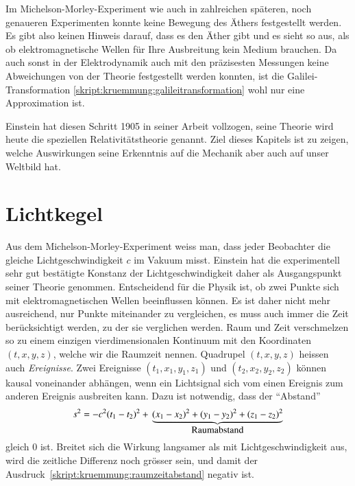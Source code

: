 Im Michelson-Morley-Experiment wie auch in zahlreichen späteren, noch
genaueren Experimenten konnte keine Bewegung des Äthers festgestellt
werden.
Es gibt also keinen Hinweis darauf, dass es den Äther gibt und es
sieht so aus, als ob elektromagnetische Wellen für Ihre Ausbreitung
kein Medium brauchen.
Da auch sonst in der Elektrodynamik auch mit den präzisesten Messungen
keine Abweichungen von der Theorie festgestellt werden konnten,
ist die Galilei-Transformation
\eqref{skript:kruemmung:galileitransformation} wohl nur eine
Approximation ist.

Einstein hat diesen Schritt 1905 in seiner Arbeit \cite{skript:einstein}
vollzogen, seine Theorie wird heute die speziellen Relativitätstheorie genannt.
Ziel dieses Kapitels ist zu zeigen, welche Auswirkungen seine
Erkenntnis auf die Mechanik aber auch auf unser Weltbild hat.
%
%

\section{Lichtkegel%
\label{skript:speziell:section:lichtkegel}}
Aus dem Michelson-Morley-Experiment weiss man, dass jeder Beobachter
die gleiche Lichtgeschwindigkeit $c$ im Vakuum misst.
Einstein hat die experimentell sehr gut bestätigte Konstanz der
Lichtgeschwindigkeit daher als Ausgangspunkt seiner Theorie genommen.
Entscheidend für die Physik ist, ob zwei Punkte sich mit elektromagnetischen
Wellen beeinflussen können.
Es ist daher nicht mehr ausreichend, nur Punkte miteinander zu vergleichen,
es muss auch immer die Zeit berücksichtigt werden, zu der sie verglichen
werden.
Raum und Zeit verschmelzen so zu einem einzigen vierdimensionalen
Kontinuum mit den Koordinaten $(t,x,y,z)$, welche wir die Raumzeit
nennen.
%
Quadrupel $(t,x,y,z)$ heissen auch {\em Ereignisse}.
%
Zwei Ereignisse $(t_1,x_1,y_1,z_1)$ und $(t_2,x_2,y_2,z_2)$ können
kausal voneinander abhängen, wenn ein Lichtsignal sich vom einen Ereignis
zum anderen Ereignis ausbreiten kann.
Dazu ist notwendig, dass der ``Abstand''
\begin{equation}
s^2
=
-c^2(t_1-t_2)^2
+
\mathstrut
\underbrace{
(x_1-x_2)^2
+
(y_1-y_2)^2
+
(z_1-z_2)^2}_{\displaystyle\text{Raumabstand}}
\label{skript:kruemmung:raumzeitabstand}
\end{equation}
gleich $0$ ist.
Breitet sich die Wirkung langsamer als mit Lichtgeschwindigkeit aus,
wird die zeitliche Differenz noch grösser sein, und damit der
Ausdruck~\eqref{skript:kruemmung:raumzeitabstand} negativ ist.

